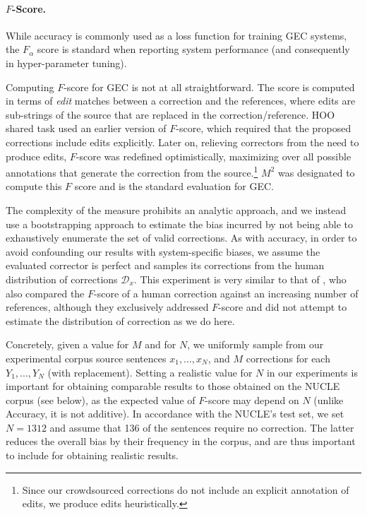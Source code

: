 \documentclass[letterpaper, 11pt]{article}
\begin{document}
\paragraph{$F$-Score.}
While accuracy is commonly used as a loss function for training GEC systems,
the $F_\alpha$ score is standard when reporting system performance (and consequently in hyper-parameter
tuning).

Computing $F$-score for GEC is not at all straightforward.
The score is computed in terms of {\it edit} matches between a correction and the references,
where edits are sub-strings of the source that are replaced in the correction/reference.
HOO shared task used an earlier version of $F$-score, which required that the proposed corrections include edits explicitly.
Later on, relieving correctors from the need to produce edits, $F$-score was redefined optimistically, maximizing
over all possible annotations that generate the correction from the source.\footnote{Since our crowdsourced corrections
	do not include an explicit annotation of edits, we produce edits heuristically.}
$M^2$ \cite{dahlmeier2012better} was designated to compute this $F$ score and is the standard evaluation for GEC.

The complexity of the measure prohibits an analytic approach, and
we instead use a bootstrapping approach to estimate the bias incurred
by not being able to exhaustively enumerate the set of valid corrections.
As with accuracy,
in order to avoid confounding our results with system-specific biases,
we assume the evaluated corrector is perfect and samples its corrections from the human distribution of corrections $\mathcal{D}_x$.
This experiment is very similar to that of ,
who also compared the $F$-score of a human correction against an increasing number of references, although they exclusively addressed $F$-score and did not attempt to estimate the distribution of correction as we do here.

Concretely, given a value for $M$ and for $N$, we uniformly sample from our experimental
corpus source sentences $x_1,...,x_N$, and $M$ corrections for each $Y_1,...,Y_N$ (with replacement).
Setting a realistic value for $N$ in our experiments is important
for obtaining comparable results to those obtained on the NUCLE corpus (see below), 
as the expected value of $F$-score may depend on $N$ (unlike Accuracy, it is not additive).
In accordance with the NUCLE's test set,
we set $N=1312$ and assume that 136 of the sentences require no correction.
The latter reduces the overall bias by their frequency in the corpus,
and are thus important to include for obtaining realistic results.
\end{document}
